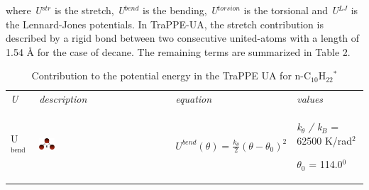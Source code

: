 \documentclass{scrbook}
\begin{document}
where \textit{U}$^{str}$ is the stretch, \textit{U}$^{bend}$ is the bending,
\textit{U}$^{torsion}$ is the torsional and \textit{U}$^{LJ}$ is the
Lennard-Jones potentials. In TraPPE-UA, the stretch contribution is described
by a rigid bond between two consecutive united-atoms with a length of 1.54
\AA{} for the case of decane. The remaining terms are summarized in Table 2.

\begin{table}
  \caption{Contribution to the potential energy in the TraPPE UA for n-C$_{10}$H$_{22}$$^{\mathrm{*}}$}
\begin{tabularx}{\textwidth}{
p{}
p{}
p{}
p{}}
\centering\arraybackslash{}\textit{U} & \centering\arraybackslash{}\textit{description} & \centering\arraybackslash{}\textit{equation} & \centering\arraybackslash{}\textit{values} \\
U$^{\mathrm{bend}}$ & \includegraphics[width=0.12\textwidth]{gfx/image30.png} & $U^{bend}\left(\theta\right)=\frac{k_{\theta}}{2}\left(\theta-\theta_{0}\right)^{2}$ & \textit{k}$_{{\theta}}$ \textit{/ k}$_{B}$ = 62500 K/rad$^{2}$ \par ${\theta}$$_{0}$ = 114.0$^{0}$ \\


\end{tabularx}
\end{table}
\end{document}
